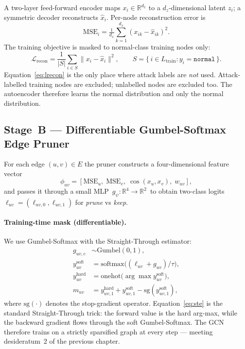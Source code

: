 \documentclass[11pt,a4paper]{report}
\theoremstyle{definition}
\theoremstyle{remark}
\begin{document}
A two-layer feed-forward encoder maps $x_i\in\mathbb{R}^{d_x}$ to a
$d_z$-dimensional latent $z_i$; a symmetric decoder reconstructs
$\hat x_i$. Per-node reconstruction error is
\[\mathrm{MSE}_i = \tfrac{1}{d_x}\sum_{k=1}^{d_x}(x_{ik}-\hat x_{ik})^2.\]
The training objective is masked to normal-class training nodes only:
\begin{equation}
\mathcal{L}_{\text{recon}}
= \frac{1}{|S|}\sum_{i\in S} \|x_i-\hat x_i\|^2,
\qquad
S = \{\,i\in L_{\text{train}} : y_i=\texttt{normal}\,\}.
\label{eq:lrecon}
\end{equation}
Equation~\eqref{eq:lrecon} is the only place where attack labels are
\emph{not} used. Attack-labelled training nodes are excluded; unlabelled
nodes are excluded too. The autoencoder therefore learns the normal
distribution and only the normal distribution.

\subsection{Stage~B --- Differentiable Gumbel-Softmax Edge Pruner}

For each edge $(u,v)\in E$ the pruner constructs a four-dimensional
feature vector
\[\phi_{uv} = [\mathrm{MSE}_u,\;\mathrm{MSE}_v,\;\cos(x_u,x_v),\;w_{uv}],\]
and passes it through a small MLP $\,g_\psi:\mathbb{R}^4\to\mathbb{R}^2\,$
to obtain two-class logits $\ell_{uv}=(\ell_{uv,0},\ell_{uv,1})$ for
\emph{prune} vs \emph{keep}.

\paragraph{Training-time mask (differentiable).}
We use Gumbel-Softmax with the Straight-Through estimator:
\begin{align}
g_{uv,c} &\sim \text{Gumbel}(0,1), \\
y^{\text{soft}}_{uv}
   &= \mathrm{softmax}\!\big((\ell_{uv}+g_{uv})/\tau\big), \\
y^{\text{hard}}_{uv}
   &= \mathrm{onehot}\!\big(\arg\max y^{\text{soft}}_{uv}\big), \\
m_{uv} &= y^{\text{hard}}_{uv,1}
       + y^{\text{soft}}_{uv,1}
       - \mathrm{sg}(y^{\text{soft}}_{uv,1}),
\label{eq:ste}
\end{align}
where $\mathrm{sg}(\cdot)$ denotes the stop-gradient operator.
Equation~\eqref{eq:ste} is the standard Straight-Through trick: the
forward value is the hard arg-max, while the backward gradient flows
through the soft Gumbel-Softmax. The GCN therefore trains on a strictly
sparsified graph at every step --- meeting desideratum~2 of the previous
chapter.
\end{document}
